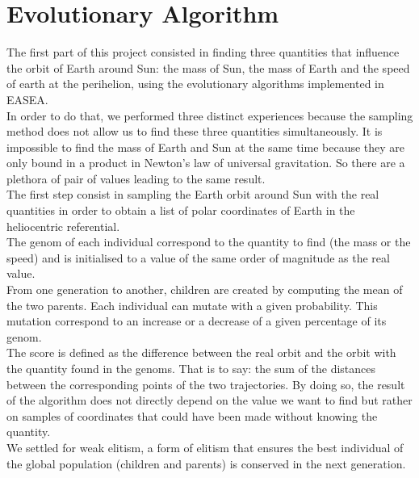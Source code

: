 \section{Evolutionary Algorithm}
The first part of this project consisted in finding three quantities that influence the orbit of Earth around Sun: the mass of Sun, the mass of Earth and the speed of earth at the perihelion, using the evolutionary algorithms implemented in EASEA.\\

In order to do that, we performed three distinct experiences because the sampling method does not allow us to find these three quantities simultaneously. It is impossible to find the mass of Earth and Sun at the same time because they are only bound in a product in Newton's law of universal gravitation. So there are a plethora of pair of values leading to the same result.\\

The first step consist in sampling the Earth orbit around Sun with the real quantities in order to obtain a list of polar coordinates of Earth in the heliocentric referential.\\
The genom of each individual correspond to the quantity to find (the mass or the speed) and is initialised to a value of the same order of magnitude as the real value.\\
From one generation to another, children are created by computing the mean of the two parents. Each individual can mutate with a given probability. This mutation correspond to an increase or a decrease of a given percentage of its genom.\\
The score is defined as the difference between the real orbit and the orbit with the quantity found in the genoms. That is to say: the sum of the distances between the corresponding points of the two trajectories. By doing so, the result of the algorithm does not directly depend on the value we want to find but rather on samples of coordinates that could have been made without knowing the quantity.\\
We settled for weak elitism, a form of elitism that ensures the best individual of the global population (children and parents) is conserved in the next generation.


